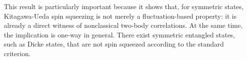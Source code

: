 This result is particularly important because it shows that, for symmetric states, Kitagawa-Ueda spin squeezing is not merely a fluctuation-based property: it is already a direct witness of nonclassical two-body correlations. At the same time, the implication is one-way in general. There exist symmetric entangled states, such as Dicke states, that are not spin squeezed according to the standard criterion.
